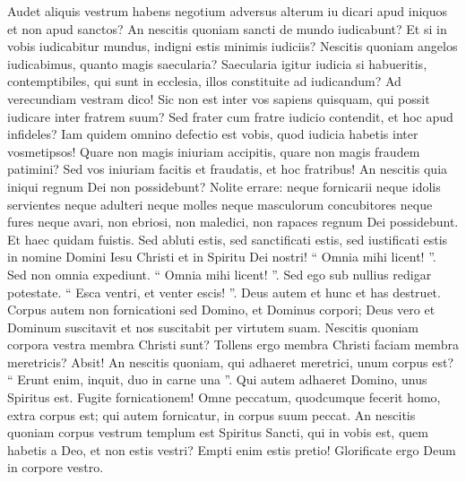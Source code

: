 \begin{biblechapter}
\begin{biblechapter}
\begin{biblechapter}
\begin{biblechapter}
\begin{biblechapter}
\begin{biblechapter}
\verse Audet aliquis vestrum habens negotium adversus alterum iu dicari apud iniquos et non apud sanctos? 
\verse An nescitis quoniam sancti de mundo iudicabunt? Et si in vobis iudicabitur mundus, indigni estis minimis iudiciis? 
\verse Nescitis quoniam angelos iudicabimus, quanto magis saecularia?
 \verse Saecularia igitur iudicia si habueritis, contemptibiles, qui sunt in ecclesia, illos constituite ad iudicandum? 
\verse Ad verecundiam vestram dico! Sic non est inter vos sapiens quisquam, qui possit iudicare inter fratrem suum? 
\verse Sed frater cum fratre iudicio contendit, et hoc apud infideles? 
\verse Iam quidem omnino defectio est vobis, quod iudicia habetis inter vosmetipsos! Quare non magis iniuriam accipitis, quare non magis fraudem patimini? 
\verse Sed vos iniuriam facitis et fraudatis, et hoc fratribus! 
\verse An nescitis quia iniqui regnum Dei non possidebunt? Nolite errare: neque fornicarii neque idolis servientes neque adulteri neque molles neque masculorum concubitores 
\verse neque fures neque avari, non ebriosi, non maledici, non rapaces regnum Dei possidebunt.
 \verse Et haec quidam fuistis. Sed abluti estis, sed sanctificati estis, sed iustificati estis in nomine Domini Iesu Christi et in Spiritu Dei nostri!
 \verse “ Omnia mihi licent! ”. Sed non omnia expediunt. “ Omnia mihi licent! ”. Sed ego sub nullius redigar potestate. 
\verse “ Esca ventri, et venter escis! ”. Deus autem et hunc et has destruet. Corpus autem non fornicationi sed Domino, et Dominus corpori; 
\verse Deus vero et Dominum suscitavit et nos suscitabit per virtutem suam.
 \verse Nescitis quoniam corpora vestra membra Christi sunt? Tollens ergo membra Christi faciam membra meretricis? Absit! 
\verse An nescitis quoniam, qui adhaeret meretrici, unum corpus est? “ Erunt enim, inquit, duo in carne una ”. 
 \verse Qui autem adhaeret Domino, unus Spiritus est. 
\verse Fugite fornicationem! Omne peccatum, quodcumque fecerit homo, extra corpus est; qui autem fornicatur, in corpus suum peccat. 
\verse An nescitis quoniam corpus vestrum templum est Spiritus Sancti, qui in vobis est, quem habetis a Deo, et non estis vestri? 
 \verse Empti enim estis pretio! Glorificate ergo Deum in corpore vestro.
 

\end{biblechapter}
\end{biblechapter}
\end{biblechapter}
\end{biblechapter}
\end{biblechapter}
\end{biblechapter}
